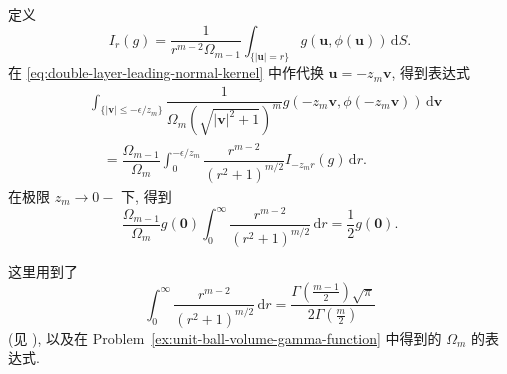 定义
\begin{equation}\label{eq:double-layer-tangential-spherical-mean}
I_r(g)=\dfrac1{r^{m-2}\Omega_{m-1}}\int_{\{|\bm{u}|=r\}}g(\bm{u},\phi(\bm{u}))\,\mathrm{d}S.
\end{equation}
在 \eqref{eq:double-layer-leading-normal-kernel} 中作代换 $\bm{u}=-z_m\bm{v}$, 得到表达式
\begin{equation}\label{eq:double-layer-scaled-radial-integral}
\begin{aligned}
&\int_{\{|\bm{v}|\leq-\epsilon/z_m\}}\dfrac1{\Omega_m(\sqrt{|\bm{v}|^2+1})^m}g(-z_m\bm{v},\phi(-z_m\bm{v}))\,\mathrm{d}\bm{v}\\
&\quad=\dfrac{\Omega_{m-1}}{\Omega_m}\int_0^{-\epsilon/z_m}\dfrac{r^{m-2}}{(r^2+1)^{m/2}}I_{-z_mr}(g)\,\mathrm{d}r.
\end{aligned}
\end{equation}
在极限 $z_m\to0-$ 下, 得到
\begin{equation}\label{eq:double-layer-half-density-jump-limit}
\dfrac{\Omega_{m-1}}{\Omega_m}g(\bm{0})\int_0^\infty\dfrac{r^{m-2}}{(r^2+1)^{m/2}}\,\mathrm{d}r=\dfrac12g(\bm{0}).
\end{equation}


这里用到了
\begin{equation}\label{eq:double-layer-radial-gamma-integral}
\int_0^\infty\dfrac{r^{m-2}}{(r^2+1)^{m/2}}\,\mathrm{d}r=\dfrac{\Gamma(\frac{m-1}2)\sqrt\pi}{2\Gamma(\frac m2)}
\end{equation}
(见 \cite[p.~292]{GR}), 以及在 Problem~\ref{ex:unit-ball-volume-gamma-function} 中得到的 $\Omega_m$ 的表达式.
